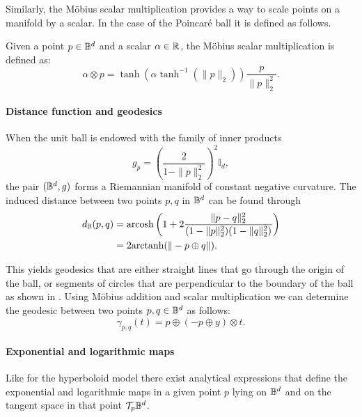 Similarly, the Möbius scalar multiplication provides a way to scale points on a manifold by a scalar. In the case of the Poincaré ball it is defined as follows.

\begin{definition}
    Given a point $p\in\mathbb{B}^d$ and a scalar $\alpha\in\mathbb{R}$, the Möbius scalar multiplication is defined as:
    \begin{equation*}
        \alpha \otimes p = \tanh({\alpha \tanh^{-1}(\|p\|_2)})\frac{p}{\|p\|^2_2}.
    \end{equation*}
\end{definition}

\paragraph{Distance function and geodesics}
When the unit ball is endowed with the family of inner products
\begin{equation*}
    g_p = \left(\frac{2}{1-\|p\|^2_2}\right)^2\mathbb{I}_d,
\end{equation*}
the pair $(\mathbb{B}^d,g)$ forms a Riemannian manifold of constant negative curvature. The induced distance between two points $p,q$ in $\mathbb{B}^d$ can be found through
\begin{align}\label{eq:poincareDistance}
    d_{\mathbb{B}}(p,q) &= \text{arcosh}\left(1 + 2\frac{\|p-q\|^2_2}{(1-\|p\|^2_2)(1-\|q\|^2_2)}\right)\\
              &= 2\text{arctanh}(\|-p\oplus q\|).
\end{align}

This yields geodesics that are either straight lines that go through the origin of the ball, or segments of circles that are perpendicular to the boundary of the ball as shown in . Using Möbius addition and scalar multiplication we can determine the geodesic between two points $p,q\in\mathbb{B}^d$ as follows:
\begin{equation*}
    \gamma_{p,q}(t) = p\oplus (-p \oplus y) \otimes t.
\end{equation*}

\paragraph{Exponential and logarithmic maps}\label{sec:expLogMaps_poincareBall}
Like for the hyperboloid model there exist analytical expressions that define the exponential and logarithmic maps in a given point $p$ lying on $\mathbb{B}^d$ and on the tangent space in that point $\mathcal{T}_p\mathbb{B}^d$. 

